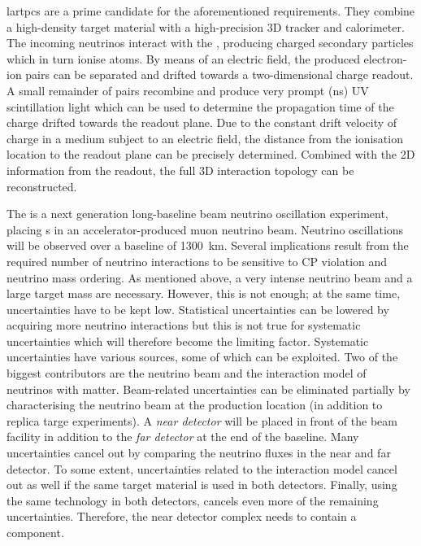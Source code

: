 \glspl{lartpc} are a prime candidate for the aforementioned requirements.
They combine a high-density target material with a high-precision 3D tracker and calorimeter.
The incoming neutrinos interact with the \lar{}, producing charged secondary particles which in turn ionise  atoms.
By means of an electric field, the produced electron-ion pairs can be separated and drifted towards a two-dimensional charge readout.
A small remainder of pairs recombine and produce very prompt (\si{\nano\second}) UV scintillation light which can be used to determine the propagation time of the charge drifted towards the readout plane.
Due to the constant drift velocity of charge in a medium subject to an electric field, the distance from the ionisation location to the readout plane can be precisely determined.
Combined with the 2D information from the readout, the full 3D interaction topology can be reconstructed.

The \dune{} is a next generation long-baseline beam neutrino oscillation experiment, placing \lartpc{}s in an accelerator-produced muon neutrino beam.
Neutrino oscillations will be observed over a baseline of \SI{1300}{\kilo\metre}.
Several implications result from the required number of neutrino interactions to be sensitive to CP violation and neutrino mass ordering.
As mentioned above, a very intense neutrino beam and a large target mass are necessary.
However, this is not enough; at the same time, uncertainties have to be kept low.
Statistical uncertainties can be lowered by acquiring more neutrino interactions but this is not true for systematic uncertainties which will therefore become the limiting factor.
Systematic uncertainties have various sources, some of which can be exploited.
Two of the biggest contributors are the neutrino beam and the interaction model of neutrinos with matter.
Beam-related uncertainties can be eliminated partially by characterising the neutrino beam at the production location (in addition to replica targe experiments).
A \emph{near detector} will be placed in front of the beam facility in addition to the \emph{far detector} at the end of the baseline.
Many uncertainties cancel out by comparing the neutrino fluxes in the near and far detector.
To some extent, uncertainties related to the interaction model cancel out as well if the same target material is used in both detectors.
Finally, using the same technology in both detectors, cancels even more of the remaining uncertainties.
Therefore, the near detector complex needs to contain a \lartpc{} component.

